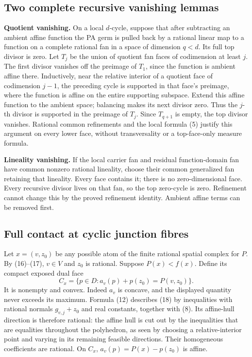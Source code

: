 \documentclass[
  11pt,
]{article}
\begin{document}
\subsection{Two complete recursive vanishing
lemmas}\label{two-complete-recursive-vanishing-lemmas}

\textbf{Quotient vanishing.} On a local \(d\)-cycle, suppose that after
subtracting an ambient affine function the PA germ is pulled back by a
rational linear map to a function on a complete rational fan in a space
of dimension \(q<d\). Its full top divisor is zero. Let \(T_j\) be the
union of quotient fan faces of codimension at least \(j\). The first
divisor vanishes off the preimage of \(T_1\), since the function is
ambient affine there. Inductively, near the relative interior of a
quotient face of codimension \(j-1\), the preceding cycle is supported
in that face's preimage, where the function is affine on the entire
supporting subspace. Extend this affine function to the ambient space;
balancing makes its next divisor zero. Thus the \(j\)-th divisor is
supported in the preimage of \(T_j\). Since \(T_{q+1}\) is empty, the
top divisor vanishes. Rational common refinements and the local formula
(5) justify this argument on every lower face, without transversality or
a top-face-only measure formula.

\textbf{Lineality vanishing.} If the local carrier fan and residual
function-domain fan have common nonzero rational lineality, choose their
common generalized fan retaining that lineality. Every face contains it;
there is no zero-dimensional face. Every recursive divisor lives on that
fan, so the top zero-cycle is zero. Refinement cannot change this by the
proved refinement identity. Ambient affine terms can be removed first.

\subsection{Full contact at cyclic junction
fibres}\label{full-contact-at-cyclic-junction-fibres}

Let \(x=(v,z_0)\) be any possible atom of the finite rational spatial
complex for \(P\). By (16)--(17), \(v\in V\) and \(z_0\) is rational.
Suppose \(P(x)<f(x)\). Define its compact exposed dual face \[
 C_x=\{p\in D:a_v(p)+p(z_0)=P(v,z_0)\}.                                  \tag{18}
\] It is nonempty and convex. Indeed \(a_v\) is concave, and the
displayed quantity never exceeds its maximum. Formula (12) describes
(18) by inequalities with rational normals \(g_{v,j}+z_0\) and real
constants, together with (8). Its affine-hull direction is therefore
rational: the affine hull is cut out by the inequalities that are
equalities throughout the polyhedron, as seen by choosing a
relative-interior point and varying in its remaining feasible
directions. Their homogeneous coefficients are rational. On \(C_x\),
\(a_v(p)=P(x)-p(z_0)\) is affine.
\end{document}

